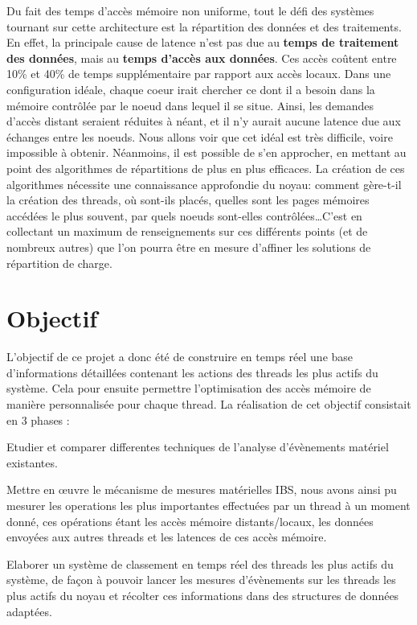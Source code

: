     Du fait des temps d'accès mémoire non uniforme, tout le défi des systèmes
    tournant sur cette architecture est la répartition des données et des
    traitements. En effet, la principale cause de latence n'est pas due au
    \textbf{temps de traitement des données}, mais au \textbf{temps d'accès aux
      données}. Ces accès coûtent entre 10\% et 40\% de temps supplémentaire par
    rapport aux accès locaux.\cite{Lepers2014} Dans une configuration idéale,
    chaque coeur irait chercher ce dont il a besoin dans la mémoire contrôlée
    par le noeud dans lequel il se situe. Ainsi, les demandes d'accès distant
    seraient réduites à néant, et il n'y aurait aucune latence due aux échanges
    entre les noeuds. Nous allons voir que cet idéal est très difficile, voire
    impossible à obtenir. Néanmoins, il est possible de s'en approcher, en
    mettant au point des algorithmes de répartitions de plus en plus
    efficaces. La création de ces algorithmes nécessite une connaissance
    approfondie du noyau: comment gère-t-il la création des threads, où sont-ils
    placés, quelles sont les pages mémoires accédées le plus souvent, par quels
    noeuds sont-elles contrôlées\ldots C'est en collectant un maximum de
    renseignements sur ces différents points (et de nombreux autres) que l'on
    pourra être en mesure d'affiner les solutions de répartition de charge.

  \section*{Objectif}
  
    L'objectif de ce projet a donc été de construire en temps réel une base
    d'informations détaillées contenant les actions des threads les plus actifs
    du système. Cela pour ensuite permettre l'optimisation des accès mémoire de
    manière personnalisée pour chaque thread. La réalisation de cet objectif
    consistait en 3 phases :

      \bitem
        \item{Etudier et comparer differentes techniques de l'analyse
          d'évènements matériel existantes.}
        \item{Mettre en \oe uvre le mécanisme de mesures matérielles IBS, nous
          avons ainsi pu mesurer les operations les plus importantes effectuées
          par un thread à un moment donné, ces opérations étant les accès
          mémoire distants/locaux, les données envoyées aux autres threads et
          les latences de ces accès mémoire.}
        \item{Elaborer un système de classement en temps réel des threads les
          plus actifs du système, de façon à pouvoir lancer les mesures
          d'évènements sur les threads les plus actifs du noyau et récolter ces
          informations dans des structures de données adaptées.}
      \eitem

